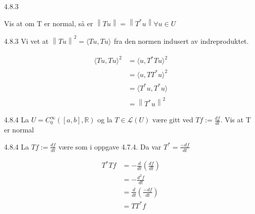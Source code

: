 \documentclass[a4paper,norsk]{article}
\begin{document}
\begin{oppgavebox}{4.8.3}{}

Vis at om T er normal, så er $ \left\lVert Tu \right\rVert = \left\lVert T^*u \right\rVert \forall u \in U $ 

\begin{proofbox}{4.8.3}{}
    Vi vet at $ \left\lVert Tu \right\rVert^2 =  \langle Tu, Tu \rangle_{  }  $ fra den normen indusert av indreproduktet. 

    \begin{align*}
        \langle Tu, Tu \rangle_{  }^2   &= \langle u, T^* Tu \rangle_{  }^2   \\
        &= \langle u, TT^* u \rangle_{  }^2\\
        &= \langle T^*u, T^*u \rangle_{  } \\
        &= \left\lVert T^*u \right\rVert ^2
    \end{align*}
\end{proofbox}

\end{oppgavebox}

\begin{oppgavebox}{4.8.4}{}
La $ U = C_0^{\infty} \left( \left[ a,b \right] , \mathbb{R} \right)  $ og la $ T \in \mathcal{L} \left( U \right)  $ være gitt ved $ Tf := \frac{ df }{ dt } $. Vis at T er normal
\begin{proofbox}{4.8.4}{}
La $ Tf := \frac{ df }{ dt } $ være som i oppgave 4.7.4. Da var $ T^* = \frac{ -df }{ dt } $

\begin{align*}
    T^*Tf &= - \frac{ d }{ dt }  \left( \frac{ df }{ dt } \right) \\
    &= - \frac{ d^2 f  }{ dt } \\
    &= \frac{ d }{ dt } \left( \frac{ -df }{ dt } \right) \\
    &= TT^*f
\end{align*}
\end{proofbox}


\end{oppgavebox}
\end{document}
